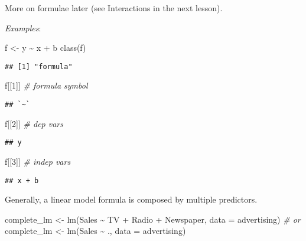 \documentclass[
  oneside]{book}
\newenvironment{Shaded}{\begin{snugshade}}{\end{snugshade}}
\newcommand{\AttributeTok}[1]{\textcolor[rgb]{0.77,0.63,0.00}{#1}}
\newcommand{\CommentTok}[1]{\textcolor[rgb]{0.56,0.35,0.01}{\textit{#1}}}
\newcommand{\DecValTok}[1]{\textcolor[rgb]{0.00,0.00,0.81}{#1}}
\newcommand{\FunctionTok}[1]{\textcolor[rgb]{0.00,0.00,0.00}{#1}}
\newcommand{\NormalTok}[1]{#1}
\newcommand{\OtherTok}[1]{\textcolor[rgb]{0.56,0.35,0.01}{#1}}
\newcommand{\SpecialCharTok}[1]{\textcolor[rgb]{0.00,0.00,0.00}{#1}}
\begin{document}
More on formulae later (see Interactions in the next lesson).

\emph{Examples}:

\begin{Shaded}
\begin{Highlighting}[]
\NormalTok{f }\OtherTok{\textless{}{-}}\NormalTok{ y }\SpecialCharTok{\textasciitilde{}}\NormalTok{ x }\SpecialCharTok{+}\NormalTok{ b}
\FunctionTok{class}\NormalTok{(f)}
\end{Highlighting}
\end{Shaded}

\begin{verbatim}
## [1] "formula"
\end{verbatim}

\begin{Shaded}
\begin{Highlighting}[]
\NormalTok{f[[}\DecValTok{1}\NormalTok{]] }\CommentTok{\# formula symbol}
\end{Highlighting}
\end{Shaded}

\begin{verbatim}
## `~`
\end{verbatim}

\begin{Shaded}
\begin{Highlighting}[]
\NormalTok{f[[}\DecValTok{2}\NormalTok{]] }\CommentTok{\# dep vars}
\end{Highlighting}
\end{Shaded}

\begin{verbatim}
## y
\end{verbatim}

\begin{Shaded}
\begin{Highlighting}[]
\NormalTok{f[[}\DecValTok{3}\NormalTok{]] }\CommentTok{\# indep vars}
\end{Highlighting}
\end{Shaded}

\begin{verbatim}
## x + b
\end{verbatim}

Generally, a linear model formula is composed by multiple
predictors.

\begin{Shaded}
\begin{Highlighting}[]
\NormalTok{complete\_lm }\OtherTok{\textless{}{-}} \FunctionTok{lm}\NormalTok{(Sales }\SpecialCharTok{\textasciitilde{}}\NormalTok{ TV }\SpecialCharTok{+}\NormalTok{ Radio }\SpecialCharTok{+}\NormalTok{ Newspaper, }\AttributeTok{data =}\NormalTok{ advertising)}
\CommentTok{\# or}
\NormalTok{complete\_lm }\OtherTok{\textless{}{-}} \FunctionTok{lm}\NormalTok{(Sales }\SpecialCharTok{\textasciitilde{}}\NormalTok{ ., }\AttributeTok{data =}\NormalTok{ advertising)}
\end{Highlighting}
\end{Shaded}
\end{document}
